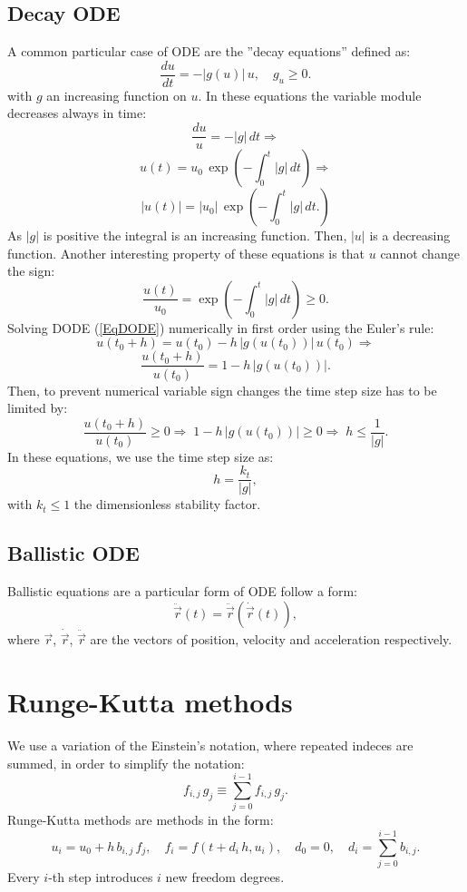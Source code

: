 \documentclass[a4paper]{article}
\newcommand{\ABS}[1]{\left|#1\right|}
\newcommand{\DD}[2]{\frac{d#1}{d#2}}
\newcommand{\EQ}[2]{\begin{equation}#1\label{#2}\end{equation}}
\newcommand{\PA}[1]{\left(#1\right)}
\begin{document}
\subsection{Decay ODE}

A common particular case of ODE are the ''decay equations'' defined as:
\EQ{\DD{u}{t}=-|g(u)|\,u,\quad g_u\geq0.}{EqDODE}
with $g$ an increasing function on $u$. In these equations the variable module
decreases always in time:
\[\frac{du}{u}=-|g|\,dt\Rightarrow\]
\[u(t)=u_0\,\exp\PA{-\int_0^t|g|\,dt}\Rightarrow\]
\EQ{|u(t)|=\ABS{u_0}\,\exp\PA{-\int_0^t|g|\,dt.}}{EqDecay}
As $|g|$ is positive the integral is an increasing function. Then, $|u|$ is a
decreasing function. Another interesting property of these equations is that $u$
cannot change the sign:
\EQ{\frac{u(t)}{u_0}=\exp\PA{-\int_0^t|g|\,dt}\geq 0.}{EqDODEP}
Solving DODE (\ref{EqDODE}) numerically in first order using the Euler's rule:
\[u\PA{t_0+h}=u\PA{t_0}-h\,\ABS{g\PA{u\PA{t_0}}}\,u\PA{t_0}\Rightarrow\]
\EQ{\frac{u\PA{t_0+h}}{u\PA{t_0}}=1-h\,\ABS{g\PA{u\PA{t_0}}}.}{EqDODEI}
Then, to prevent numerical variable sign changes the time step size has to be
limited by:
\EQ
{
	\frac{u\PA{t_0+h}}{u\PA{t_0}}\geq0\Rightarrow\;
	1-h\,\ABS{g\PA{u\PA{t_0}}}\geq0\Rightarrow\;
	h\leq\frac{1}{|g|}.
}{EqDODELimit}
In these equations, we use the time step size as:
\EQ{h=\frac{k_t}{|g|},}{EqDODE dt}
with $k_t\leq1$ the dimensionless stability factor. 

\subsection{Ballistic ODE}

Ballistic equations are a particular form of ODE follow a form:
\EQ{\ddot{\vec{r}}(t)=\ddot{\vec{r}}\PA{\dot{\vec{r}}(t)},}{EqBODE}
where $\vec{r}$, $\dot{\vec{r}}$, $\ddot{\vec{r}}$ are the vectors of position,
velocity and acceleration respectively.

\section{Runge-Kutta methods}

We use a variation of the Einstein's notation, where repeated indeces are
summed, in order to simplify the notation:
\EQ{f_{i,j}\,g_j\equiv\sum_{j=0}^{i-1}f_{i,j}\,g_j.}{EqNotation}
Runge-Kutta methods are methods in the form:
\EQ
{
	u_i=u_0+h\,b_{i,j}\,f_j,\quad
	f_i=f\PA{t+d_i\,h,u_i},\quad
	d_0=0,\quad
	d_i=\sum_{j=0}^{i-1}b_{i,j}.
}{EqRK}
Every $i$-th step introduces $i$ new freedom degrees.
\end{document}
